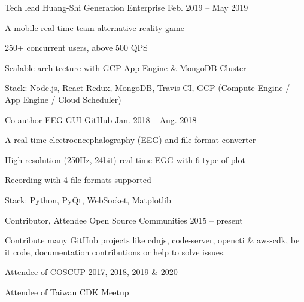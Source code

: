 
\begin{cventries}

  \cventry
    {Tech lead} %
    {Huang-Shi Generation} %
    {Enterprise} %
    {Feb. 2019 -- May 2019} %
    {
      \begin{cvitems} %
        \item {A mobile real-time team alternative reality game}
        \item {250+ concurrent users, above 500 QPS}
        \item {Scalable architecture with GCP App Engine \& MongoDB Cluster}
        \item {Stack: Node.js, React-Redux, MongoDB, Travis CI, GCP (Compute Engine / App Engine / Cloud Scheduler)}
      \end{cvitems}
    }

  \cventry
    {Co-author} %
    {EEG GUI} %
    {GitHub} %
    {Jan. 2018 -- Aug. 2018} %
    {
      \begin{cvitems} %
        \item {A real-time electroencephalography (EEG) and file format converter}
        \item {High resolution (250Hz, 24bit) real-time EGG with 6 type of plot}
        \item {Recording with 4 file formats supported}
        \item {Stack: Python, PyQt, WebSocket, Matplotlib}
      \end{cvitems}
    }

  \cventry
    {Contributor, Attendee} %
    {Open Source Communities} %
    {} %
    {2015 -- present} %
    {
      \begin{cvitems} %
        \item
        {
          Contribute many GitHub projects like cdnjs, code-server, opencti \& aws-cdk,
          be it code, documentation contributions or help to solve issues.
        }
        \item {Attendee of COSCUP 2017, 2018, 2019 \& 2020}
        \item {Attendee of Taiwan CDK Meetup}
      \end{cvitems}
    }

\end{cventries}
